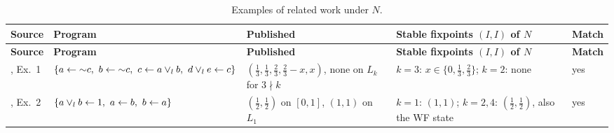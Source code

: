     {\scriptsize
        \begin{longtable}{@{}p{}p{}p{}p{}p{}@{}}
            \caption{Examples of related work under $N$.}\label{tab:examples-literature}                                                                                                                                                                                                                                                                                                                                                                                   \\
            \toprule
            \textbf{Source}                                      & \textbf{Program}                                                                                                                                                  & \textbf{Published}                                                    & \textbf{Stable fixpoints $(I,I)$ of $N$}                                                                                        & \textbf{Match}            \\
            \midrule\endfirsthead
            \toprule
            \textbf{Source}                                      & \textbf{Program}                                                                                                                                                  & \textbf{Published}                                                    & \textbf{Stable fixpoints $(I,I)$ of $N$}                                                                                        & \textbf{Match}            \\
            \midrule\endhead
            \bottomrule\endfoot
            \cite{MushthofaSD15}, Ex.~1                          & $\{a\leftarrow\flpnot  c,\ b\leftarrow\flpnot  c,\ c\leftarrow a\flpor_l b,\ d\flpor_l e\leftarrow c\}$                                                           & $(\frac13,\frac13,\frac23,\frac23-x,x)$, none on $L_k$ for $3\nmid k$ & $k=3$: $x\in\{0,\frac13,\frac23\}$; $k=2$: none                                                                                 & yes                       \\
            \cite{MushthofaSD15,MushthofaSD20}, Ex.~2            & $\{a\lor_l b\leftarrow1,\ a\leftarrow b,\ b\leftarrow a\}$                                                                                                      & $(\frac12,\frac12)$ on $[0,1]$, $(1,1)$ on $L_1$                      & $k=1$: $(1,1)$; $k=2,4$: $(\frac12,\frac12)$, also the WF state                                                                 & yes                       \\

\end{longtable}}
